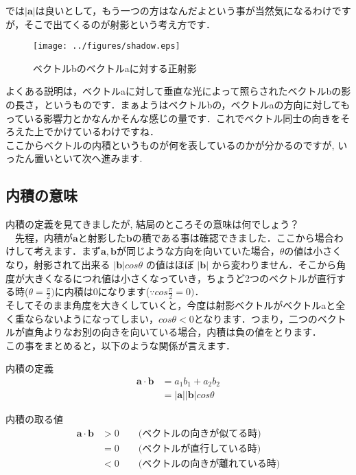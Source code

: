 \documentclass[11pt,a4paper]{ujreport}
\begin{document}
では$|\mathbf{a}|$は良いとして，もう一つの方はなんだよという事が当然気になるわけですが，そこで出てくるのが射影という考え方です．

\begin{figure}[H]
\label{im:shadow}
  \centering
  \texttt{[image: ../figures/shadow.eps]}
  \caption{ベクトルbのベクトルaに対する正射影}
\end{figure}

よくある説明は，ベクトルaに対して垂直な光によって照らされたベクトルbの影の長さ，というものです．まぁようはベクトルbの，ベクトルaの方向に対してもっている影響力とかなんかそんな感じの量です．これでベクトル同士の向きをそろえた上でかけているわけですね．\\

ここからベクトルの内積というものが何を表しているのかが分かるのですが, いったん置いといて次へ進みます.\\

\subsection{内積の意味}
内積の定義を見てきましたが, 結局のところその意味は何でしょう？\\
　先程，内積が$\mathbf{a}$と射影した$\mathbf{b}$の積である事は確認できました．ここから場合わけして考えます．まず$\mathbf{a,b}$が同じような方向を向いていた場合，$\theta$の値は小さくなり，射影されて出来る $|\mathbf{b}|cos\theta$ の値はほぼ $| \mathbf{b}|$ から変わりません．そこから角度が大きくなるにつれ値は小さくなっていき，ちょうど2つのベクトルが直行する時($\theta = \frac{\pi}{2})$に内積は0になります($\because cos\frac{\pi}{2}=0)$．\\

そしてそのまま角度を大きくしていくと，今度は射影ベクトルがベクトルaと全く重ならないようになってしまい，$cos\theta < 0$となります．つまり，二つのベクトルが直角よりなお別の向きを向いている場合，内積は負の値をとります．\\

この事をまとめると，以下のような関係が言えます．

\begin{screen}
内積の定義
\begin{align}
  \mathbf{a}\cdot\mathbf{b} &= a_1b_1 + a_2b_2\\
&= |\mathbf{a}||\mathbf{b}|cos\theta 
\end{align}

内積の取る値
\begin{align}
\mathbf{a}\cdot \mathbf{b} &> 0 \qquad \text{(ベクトルの向きが似てる時)}\\
&=0 \qquad \text{(ベクトルが直行している時)}\\
&<0 \qquad \text{(ベクトルの向きが離れている時)}
\end{align}

\end{screen}
\end{document}
